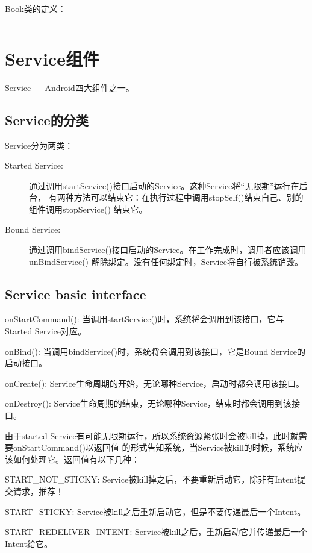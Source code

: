 ﻿\documentclass[a4paper,11pt]{article}
\begin{document}
  Book类的定义：\par
  \inputminted[linenos,tabsize=4,bgcolor=srcbg]{java}{ParcableBook.java}


  \section[Service组件]{Service组件}
  Service --- Android四大组件之一。

  \subsection[Service的分类]{Service的分类}
  Service分为两类：\par
  \begin{description}
    \item[Started Service:] 通过调用startService()接口启动的Service。这种Service将“无限期”运行在后台，
                            有两种方法可以结束它：在执行过程中调用stopSelf()结束自己、别的组件调用stopService() 结束它。
    \item[Bound Service:] 通过调用bindService()接口启动的Service。在工作完成时，调用者应该调用unBindService()
                          解除绑定。没有任何绑定时，Service将自行被系统销毁。
  \end{description}

  \subsection[Service basic interface]{Service basic interface}
  \begin{coloredenumerate}
    \item onStartCommand(): 当调用startService()时，系统将会调用到该接口，它与Started Service对应。
    \item onBind(): 当调用bindService()时，系统将会调用到该接口，它是Bound Service的启动接口。
    \item onCreate(): Service生命周期的开始，无论哪种Service，启动时都会调用该接口。
    \item onDestroy(): Service生命周期的结束，无论哪种Service，结束时都会调用到该接口。
  \end{coloredenumerate}

  由于started Service有可能无限期运行，所以系统资源紧张时会被kill掉，此时就需要onStartCommand()以返回值
  的形式告知系统，当Service被kill的时候，系统应该如何处理它。返回值有以下几种：\par
  \begin{coloredenumerate}
    \item START\_NOT\_STICKY: Service被kill掉之后，不要重新启动它，除非有Intent提交请求，推荐！
    \item START\_STICKY: Service被kill之后重新启动它，但是不要传递最后一个Intent。
    \item START\_REDELIVER\_INTENT: Service被kill之后，重新启动它并传递最后一个Intent给它。
  \end{coloredenumerate}
\end{document}
